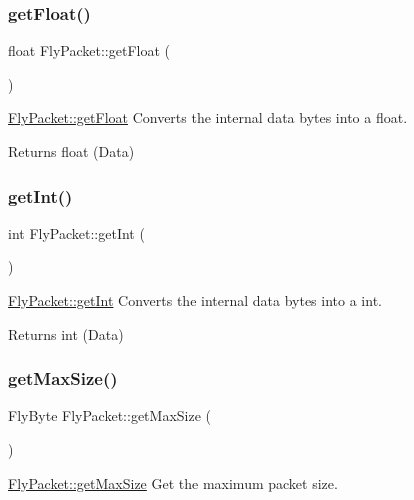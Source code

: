 \subsubsection{\texorpdfstring{get\+Float()}{getFloat()}}
{\footnotesize\ttfamily float Fly\+Packet\+::get\+Float (\begin{DoxyParamCaption}{ }\end{DoxyParamCaption})}



\hyperlink{class_fly_packet_a8987702368547e049b1f7ab8e979ce91}{Fly\+Packet\+::get\+Float} Converts the internal data bytes into a float. 

\begin{DoxyReturn}{Returns}
float (Data) 
\end{DoxyReturn}
\hypertarget{class_fly_packet_a0a24a69f5c318d9579fac40ad5c7b502}{}\label{class_fly_packet_a0a24a69f5c318d9579fac40ad5c7b502} 
\subsubsection{\texorpdfstring{get\+Int()}{getInt()}}
{\footnotesize\ttfamily int Fly\+Packet\+::get\+Int (\begin{DoxyParamCaption}{ }\end{DoxyParamCaption})}



\hyperlink{class_fly_packet_a0a24a69f5c318d9579fac40ad5c7b502}{Fly\+Packet\+::get\+Int} Converts the internal data bytes into a int. 

\begin{DoxyReturn}{Returns}
int (Data) 
\end{DoxyReturn}
\hypertarget{class_fly_packet_ad8406536002965db603f5c9f03906794}{}\label{class_fly_packet_ad8406536002965db603f5c9f03906794} 
\subsubsection{\texorpdfstring{get\+Max\+Size()}{getMaxSize()}}
{\footnotesize\ttfamily Fly\+Byte Fly\+Packet\+::get\+Max\+Size (\begin{DoxyParamCaption}{ }\end{DoxyParamCaption})}



\hyperlink{class_fly_packet_ad8406536002965db603f5c9f03906794}{Fly\+Packet\+::get\+Max\+Size} Get the maximum packet size. 

